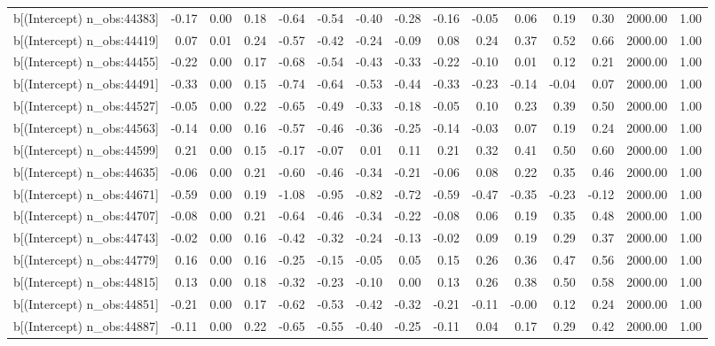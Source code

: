 \begin{table}[ht]
\begin{tabular}{rrrrrrrrrrrrrrr}
  b[(Intercept) n\_obs:44383] & -0.17 & 0.00 & 0.18 & -0.64 & -0.54 & -0.40 & -0.28 & -0.16 & -0.05 & 0.06 & 0.19 & 0.30 & 2000.00 & 1.00 \\ 
  b[(Intercept) n\_obs:44419] & 0.07 & 0.01 & 0.24 & -0.57 & -0.42 & -0.24 & -0.09 & 0.08 & 0.24 & 0.37 & 0.52 & 0.66 & 2000.00 & 1.00 \\ 
  b[(Intercept) n\_obs:44455] & -0.22 & 0.00 & 0.17 & -0.68 & -0.54 & -0.43 & -0.33 & -0.22 & -0.10 & 0.01 & 0.12 & 0.21 & 2000.00 & 1.00 \\ 
  b[(Intercept) n\_obs:44491] & -0.33 & 0.00 & 0.15 & -0.74 & -0.64 & -0.53 & -0.44 & -0.33 & -0.23 & -0.14 & -0.04 & 0.07 & 2000.00 & 1.00 \\ 
  b[(Intercept) n\_obs:44527] & -0.05 & 0.00 & 0.22 & -0.65 & -0.49 & -0.33 & -0.18 & -0.05 & 0.10 & 0.23 & 0.39 & 0.50 & 2000.00 & 1.00 \\ 
  b[(Intercept) n\_obs:44563] & -0.14 & 0.00 & 0.16 & -0.57 & -0.46 & -0.36 & -0.25 & -0.14 & -0.03 & 0.07 & 0.19 & 0.24 & 2000.00 & 1.00 \\ 
  b[(Intercept) n\_obs:44599] & 0.21 & 0.00 & 0.15 & -0.17 & -0.07 & 0.01 & 0.11 & 0.21 & 0.32 & 0.41 & 0.50 & 0.60 & 2000.00 & 1.00 \\ 
  b[(Intercept) n\_obs:44635] & -0.06 & 0.00 & 0.21 & -0.60 & -0.46 & -0.34 & -0.21 & -0.06 & 0.08 & 0.22 & 0.35 & 0.46 & 2000.00 & 1.00 \\ 
  b[(Intercept) n\_obs:44671] & -0.59 & 0.00 & 0.19 & -1.08 & -0.95 & -0.82 & -0.72 & -0.59 & -0.47 & -0.35 & -0.23 & -0.12 & 2000.00 & 1.00 \\ 
  b[(Intercept) n\_obs:44707] & -0.08 & 0.00 & 0.21 & -0.64 & -0.46 & -0.34 & -0.22 & -0.08 & 0.06 & 0.19 & 0.35 & 0.48 & 2000.00 & 1.00 \\ 
  b[(Intercept) n\_obs:44743] & -0.02 & 0.00 & 0.16 & -0.42 & -0.32 & -0.24 & -0.13 & -0.02 & 0.09 & 0.19 & 0.29 & 0.37 & 2000.00 & 1.00 \\ 
  b[(Intercept) n\_obs:44779] & 0.16 & 0.00 & 0.16 & -0.25 & -0.15 & -0.05 & 0.05 & 0.15 & 0.26 & 0.36 & 0.47 & 0.56 & 2000.00 & 1.00 \\ 
  b[(Intercept) n\_obs:44815] & 0.13 & 0.00 & 0.18 & -0.32 & -0.23 & -0.10 & 0.00 & 0.13 & 0.26 & 0.38 & 0.50 & 0.58 & 2000.00 & 1.00 \\ 
  b[(Intercept) n\_obs:44851] & -0.21 & 0.00 & 0.17 & -0.62 & -0.53 & -0.42 & -0.32 & -0.21 & -0.11 & -0.00 & 0.12 & 0.24 & 2000.00 & 1.00 \\ 
  b[(Intercept) n\_obs:44887] & -0.11 & 0.00 & 0.22 & -0.65 & -0.55 & -0.40 & -0.25 & -0.11 & 0.04 & 0.17 & 0.29 & 0.42 & 2000.00 & 1.00 \\ 

\end{tabular}
\end{table}
